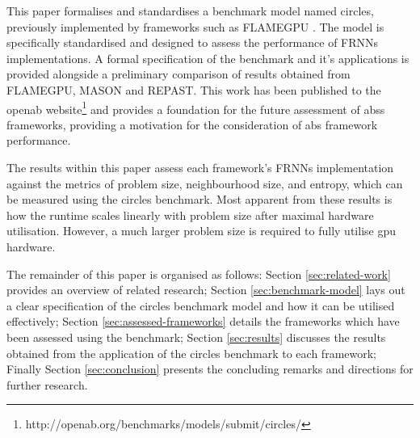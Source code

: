   This paper formalises and standardises a benchmark model named circles, previously implemented by frameworks such as FLAMEGPU \cite{RR082}. The model is specifically standardised and designed to assess the performance of FRNNs implementations. A formal specification of the benchmark and it's applications is provided alongside a preliminary comparison of results obtained from FLAMEGPU, MASON and REPAST. This work has been published to the \gls{openab} website\footnote{http://openab.org/benchmarks/models/submit/circles/} and provides a foundation for the future assessment of \glspl{abs} frameworks, providing a motivation for the consideration of \gls{abs} framework performance.
  
  The results within this paper assess each framework’s FRNNs implementation against the metrics of problem size, neighbourhood size, and entropy, which can be measured using the circles benchmark. Most apparent from these results is how the runtime scales linearly with problem size after maximal hardware utilisation. However, a much larger problem size is required to fully utilise \gls{gpu} hardware.
  
  The remainder of this paper is organised as follows: Section \ref{sec:related-work} provides an overview of related research; Section \ref{sec:benchmark-model} lays out a clear specification of the circles benchmark model and how it can be utilised effectively; Section \ref{sec:assessed-frameworks} details the frameworks which have been assessed using the benchmark; Section \ref{sec:results} discusses the results obtained from the application of the circles benchmark to each framework; Finally Section \ref{sec:conclusion} presents the concluding remarks and directions for further research.